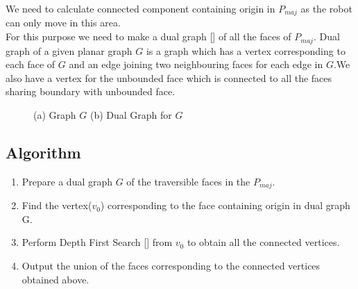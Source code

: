 We need to calculate connected component containing origin in $P_{maj}$ as the robot can only move in this area. \\

\noindent For this purpose we need to make a dual graph [\cite{CGAL}] of all the faces of $P_{maj}$. Dual graph of a given planar graph $G$ 
is a graph which has a vertex corresponding to each face of $G$ and an edge joining two neighbouring faces for each edge in $G$.We also have
a vertex for the unbounded face which is connected to all the faces sharing boundary with unbounded face.  

\begin{figure}[h]
\begin{center}
\caption{\label{fig:Dual Graph} (a) Graph $G$ (b) Dual Graph for $G$}
\end{center}
\end{figure}

\subsection{Algorithm}
\begin{enumerate}
 \item Prepare a dual graph $G$ of the traversible faces in the $P_{maj}$.
 \item Find the vertex($v_0$) corresponding to the face containing origin in dual graph G.
 \item Perform Depth First Search [\cite{BOOST}] from $v_0$ to obtain all the connected vertices.
 \item Output the union of the faces corresponding to the connected vertices obtained above.  
\end{enumerate}

